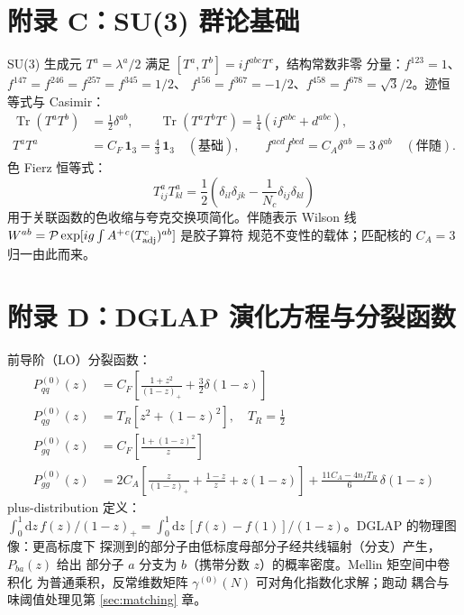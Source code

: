 \documentclass[11pt,a4paper]{ctexart}
\newcommand{\tr}{\operatorname{Tr}}
\begin{document}
\section{附录 C：SU(3) 群论基础}

SU(3) 生成元 $T^a=\lambda^a/2$ 满足 $[T^a,T^b]=if^{abc}T^c$，结构常数非零
分量：$f^{123}=1$、$f^{147}=f^{246}=f^{257}=f^{345}=1/2$、
$f^{156}=f^{367}=-1/2$、$f^{458}=f^{678}=\sqrt3/2$。迹恒等式与 Casimir：
\begin{align}
\tr(T^aT^b) &= \frac12\delta^{ab}, \qquad
\tr(T^aT^bT^c) = \frac14(if^{abc}+d^{abc}), \\
T^aT^a &= C_F\,\mathbf1_3=\frac43\,\mathbf1_3 \quad(\text{基础}), \qquad
f^{acd}f^{bcd} = C_A\delta^{ab}=3\,\delta^{ab} \quad(\text{伴随}).
\end{align}
色 Fierz 恒等式：
\begin{equation}
T^a_{ij}T^a_{kl} = \frac12\left(\delta_{il}\delta_{jk}
-\frac{1}{N_c}\delta_{ij}\delta_{kl}\right)
\end{equation}
用于关联函数的色收缩与夸克交换项简化。伴随表示 Wilson 线
$W^{ab}=\mathcal P\exp[ig\int A^+{}^c(T^c_{\rm adj})^{ab}]$ 是胶子算符
规范不变性的载体；匹配核的 $C_A=3$ 归一由此而来。

\section{附录 D：DGLAP 演化方程与分裂函数}
\label{sec:appendix-dglap}

前导阶（LO）分裂函数：
\begin{align}
P_{qq}^{(0)}(z) &= C_F\left[ \frac{1+z^2}{(1-z)_+}
+ \frac{3}{2}\delta(1-z) \right] \\
P_{qg}^{(0)}(z) &= T_R\left[ z^2+(1-z)^2 \right], \quad T_R=\frac12 \\
P_{gq}^{(0)}(z) &= C_F\left[ \frac{1+(1-z)^2}{z} \right] \\
P_{gg}^{(0)}(z) &= 2C_A\left[ \frac{z}{(1-z)_+} + \frac{1-z}{z}
+ z(1-z) \right] + \frac{11C_A-4n_fT_R}{6}\,\delta(1-z)
\end{align}
plus-distribution 定义：$\int_0^1\mathrm{d}z\,f(z)/(1-z)_+
=\int_0^1\mathrm{d}z\,[f(z)-f(1)]/(1-z)$。DGLAP 的物理图像：更高标度下
探测到的部分子由低标度母部分子经共线辐射（分支）产生，$P_{ba}(z)$ 给出
部分子 $a$ 分支为 $b$（携带分数 $z$）的概率密度。Mellin 矩空间中卷积化
为普通乘积，反常维数矩阵 $\gamma^{(0)}(N)$ 可对角化指数化求解；跑动
耦合与味阈值处理见第 \ref{sec:matching} 章。
\end{document}
